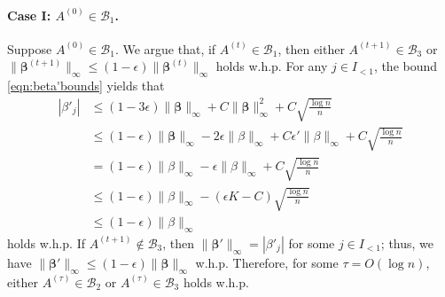 \documentclass[letterpaper,11pt]{article}
\begin{document}
\paragraph*{Case I: $A^{(0)}\in\mathcal{B}_1$.}
Suppose $A^{(0)}\in \mathcal{B}_1$.
We argue that, if $A^{(t)}\in \mathcal{B}_1$, then either $A^{(t+1)}\in \mathcal{B}_3$ or $\|{\boldsymbol \beta}^{(t+1)}\|_\infty \leq (1-\epsilon)\|{\boldsymbol \beta}^{(t)}\|_\infty$ holds w.h.p.
For any $j\in I_{<1}$, the bound \cref{eqn:beta'bounds} yields that
\begin{align*}
|\beta'_j| &\leq (1-3\epsilon)\|{\boldsymbol \beta}\|_\infty +C\|{\boldsymbol \beta}\|^2_\infty + C\sqrt{\frac{\log n}{n}} \\
&\leq (1-\epsilon)\|{\boldsymbol \beta}\|_\infty - 2\epsilon \|\beta\|_\infty + C\epsilon'\|\beta\|_\infty + C\sqrt{\frac{\log n}{n}} \\
&= (1-\epsilon)\|\beta\|_\infty - \epsilon\|\beta\|_\infty + C\sqrt{\frac{\log n}{n}} \\
&\leq (1-\epsilon)\|\beta\|_\infty-(\epsilon K-C)\sqrt{\frac{\log n}{n}} \\
&\leq (1-\epsilon)\|\beta\|_\infty
\end{align*}
holds w.h.p.
If $A^{(t+1)}\not\in\mathcal{B}_3$, then $\|{\boldsymbol \beta}'\|_\infty = |\beta'_j|$ for some $j\in I_{<1}$; thus, we have $\|{\boldsymbol \beta}'\|_\infty \leq (1-\epsilon)\|{\boldsymbol \beta}\|_\infty$ w.h.p.
Therefore, for some $\tau=O(\log n)$, either $A^{(\tau)}\in \mathcal{B}_2$ or $A^{(\tau)}\in \mathcal{B}_{3}$ holds w.h.p.
\end{document}
